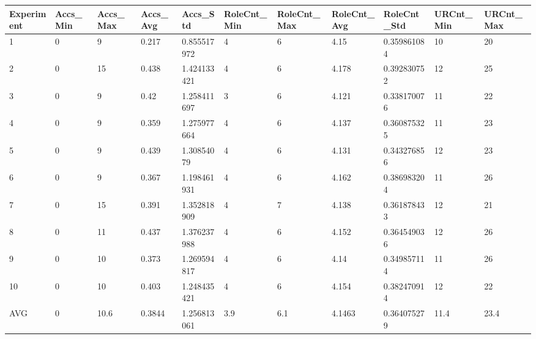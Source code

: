 \begin{table}[H]
\begin{adjustbox}{max width=360pt,keepaspectratio,angle=90}
			\end{adjustbox}
			\begin{adjustbox}{max width=380pt,keepaspectratio,angle=90}
				\begin{tabular}{|l|l|l|l|l|l|l|l|l|l|l|}
					\hline
					\rowcolor[HTML]{EFEFEF} 
					Experiment & Accs\_Min & Accs\_Max & Accs\_Avg & Accs\_Std   & RoleCnt\_Min & RoleCnt\_Max & RoleCnt\_Avg & RoleCnt\_Std & URCnt\_Min & URCnt\_Max \\ \hline
					1          & 0         & 9         & 0.217     & 0.855517972 & 4            & 6            & 4.15         & 0.359861084  & 10         & 20         \\ \hline
					2          & 0         & 15        & 0.438     & 1.424133421 & 4            & 6            & 4.178        & 0.392830752  & 12         & 25         \\ \hline
					3          & 0         & 9         & 0.42      & 1.258411697 & 3            & 6            & 4.121        & 0.338170076  & 11         & 22         \\ \hline
					4          & 0         & 9         & 0.359     & 1.275977664 & 4            & 6            & 4.137        & 0.360875325  & 11         & 23         \\ \hline
					5          & 0         & 9         & 0.439     & 1.30854079  & 4            & 6            & 4.131        & 0.343276856  & 12         & 23         \\ \hline
					6          & 0         & 9         & 0.367     & 1.198461931 & 4            & 6            & 4.162        & 0.386983204  & 11         & 26         \\ \hline
					7          & 0         & 15        & 0.391     & 1.352818909 & 4            & 7            & 4.138        & 0.361878433  & 12         & 21         \\ \hline
					8          & 0         & 11        & 0.437     & 1.376237988 & 4            & 6            & 4.152        & 0.364549036  & 12         & 26         \\ \hline
					9          & 0         & 10        & 0.373     & 1.269594817 & 4            & 6            & 4.14         & 0.349857114  & 11         & 26         \\ \hline
					10         & 0         & 10        & 0.403     & 1.248435421 & 4            & 6            & 4.154        & 0.382470914  & 12         & 22         \\ \hline
					AVG        & 0         & 10.6      & 0.3844    & 1.256813061 & 3.9          & 6.1          & 4.1463       & 0.364075279  & 11.4       & 23.4       \\ \hline

\end{tabular}
\end{adjustbox}
\end{table}
